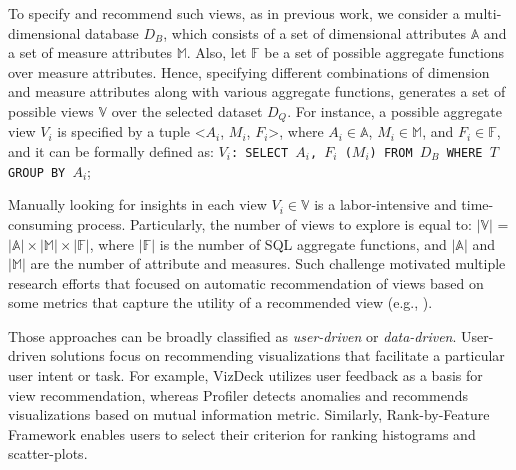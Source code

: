 To specify and recommend such views, as in previous work, we consider a multi-dimensional database $D_B$, which consists of a set of dimensional attributes $\mathbb{A}$ and a set of measure attributes $\mathbb{M}$. 
%
Also, let $\mathbb{F}$ be a set of possible aggregate functions over measure attributes. %
%
Hence, specifying different combinations of dimension and measure attributes along with various aggregate functions, generates a set of possible views $\mathbb{V}$ over the selected dataset $D_Q$.
%
For instance, a possible aggregate view $V_i$ is specified by a tuple <$ A_i$, $ M_i$, $ F_i$>, where $A_i \in \mathbb{A}$, $M_i \in \mathbb{M}$, and  $F_i \in \mathbb{F}$, and it can be formally defined as:
%
{\tt $V_i$: SELECT $A_i$, $F_i$ ($M_i$) FROM $D_B$ WHERE $T$ GROUP BY $A_i$};



%
Manually looking for insights in each view $V_i \in \mathbb{V}$ is a labor-intensive and time-consuming process. 
%
%
%
Particularly, the number of views to explore is equal to: $|\mathbb{V}|$ = $|\mathbb{A}| \times |\mathbb{M}| \times |\mathbb{F}|$, where $|\mathbb{F}|$ is the number of SQL aggregate functions, and $|\mathbb{A}|$ and $|\mathbb{M}|$ are the number of attribute and measures. %
%
%
Such challenge motivated multiple research efforts that focused on automatic recommendation of views based on some metrics that capture the utility of a recommended view (e.g., \cite{Key2012,Viegas2007,DBLP:journals/pvldb/SellamK16,DBLP:conf/ssdbm/SellamK16, Vartak2014,Vartak2015,Ehsan2016,kandel2012profiler,DBLP:journals/tvcg/SeoS06}). 
%

Those approaches can be broadly classified as {\em user-driven} or {\em data-driven}.
%
User-driven solutions focus on recommending visualizations that facilitate a particular user intent or task. 
%
For example, VizDeck \cite{Key2012} utilizes user feedback as a basis for view recommendation, whereas Profiler \cite{kandel2012profiler} detects anomalies and recommends visualizations based on mutual information metric.
%
Similarly, Rank-by-Feature Framework \cite{DBLP:journals/tvcg/SeoS06} enables users to select their criterion for ranking histograms and scatter-plots. 
%

